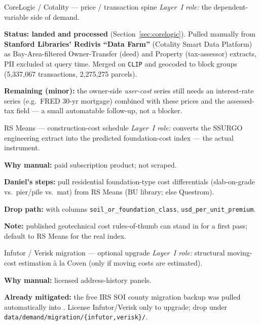 \documentclass[11pt]{article}
\newcommand{\CLNTX}{5,337,067}               %
\newcommand{\CLNPARCEL}{2,275,275}           %
\newcommand{\role}[1]{\textit{Layer~I role:} #1}
\begin{document}
\begin{receivedbox}{CoreLogic / Cotality --- price / transaction spine}
\role{the dependent-variable side of demand.}\par\smallskip
\textbf{Status: landed and processed} (Section~\ref{sec:corelogic}). Pulled
manually from \textbf{Stanford Libraries' Redivis ``Data Farm''} (Cotality Smart
Data Platform) as Bay-Area-filtered Owner-Transfer (deed) and Property
(tax-assessor) extracts, PII excluded at query time. Merged on \texttt{CLIP} and
geocoded to block groups (\CLNTX{} transactions, \CLNPARCEL{} parcels).\par
\textbf{Remaining (minor):} the owner-side \emph{user-cost} series still needs an
interest-rate series (e.g.\ FRED 30-yr mortgage) combined with these prices and
the assessed-tax field --- a small automatable follow-up, not a blocker.
\end{receivedbox}

\begin{actionbox}{RS Means --- construction-cost schedule}\label{sec:rsmeans}
\role{converts the SSURGO engineering extract into the predicted foundation-cost
index --- the actual instrument.}\par\smallskip
\textbf{Why manual:} paid subscription product; not scraped.\par
\textbf{Daniel's steps:} pull residential foundation-type cost differentials
(slab-on-grade vs.\ pier/pile vs.\ mat) from RS Means (BU library; else
Questrom).\par
\textbf{Drop path:} 
with columns \texttt{soil\_or\_foundation\_class}, \texttt{usd\_per\_unit\_premium}.\par
\textbf{Note:} published geotechnical cost rules-of-thumb can stand in for a
first pass; default to RS Means for the real index.
\end{actionbox}

\begin{actionbox}{Infutor / Verisk migration --- optional upgrade}
\role{structural moving-cost estimation à la Coven (only if moving costs are
estimated).}\par\smallskip
\textbf{Why manual:} licensed address-history panels.\par
\textbf{Already mitigated:} the free IRS SOI county migration backup was pulled
automatically into . License Infutor/Verisk
only to upgrade; drop under \texttt{data/demand/migration/\{infutor,verisk\}/}.
\end{actionbox}
\end{document}
